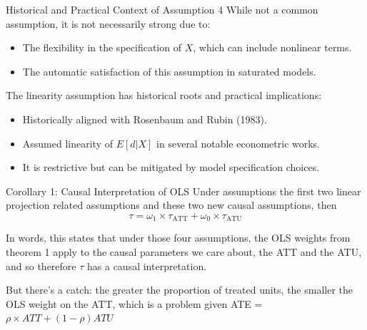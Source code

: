 \documentclass{beamer}
\begin{document}
\begin{frame}{Historical and Practical Context of Assumption 4}
  While not a common assumption, it is not necessarily strong due to:
  \begin{itemize}
    \item The flexibility in the specification of \( X \), which can include nonlinear terms.
    \item The automatic satisfaction of this assumption in saturated models.
  \end{itemize}

    The linearity assumption has historical roots and practical implications:
    \begin{itemize}
      \item Historically aligned with Rosenbaum and Rubin (1983).
      \item Assumed linearity of \( E[d | X] \) in several notable econometric works.
      \item It is restrictive but can be mitigated by model specification choices.
    \end{itemize}
\end{frame}


\begin{frame}{Corollary 1: Causal Interpretation of OLS}
  Under assumptions the first two linear projection related assumptions and these two new causal assumptions, then
  \[
    \tau = \omega_1 \times \tau_{\text{ATT}} + \omega_0 \times \tau_{\text{ATU}}
  \]
  
  In words, this states that under those four assumptions, the OLS weights from theorem 1 apply to the causal parameters we care about, the ATT and the ATU, and so therefore $\tau$ has a causal interpretation.  
  
  \bigskip
  
  But there's a catch: the greater the proportion of treated units, the smaller the OLS weight on the ATT, which is a problem given ATE = $\rho \times ATT + (1-\rho) ATU$
\end{frame}
\end{document}
